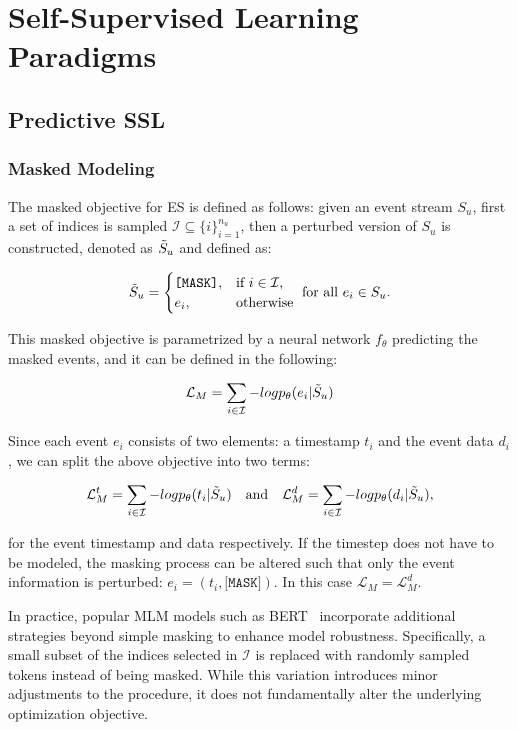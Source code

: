 \appendix
\section{Self-Supervised Learning Paradigms}
\label{appendix:ssl-paradigms}

\subsection{Predictive SSL}

\subsubsection{Masked Modeling}
\label{appendix:masked-modeling}

The masked objective for ES is defined as follows:
given an event stream $S_u$, first a set of indices is sampled $\mathcal{I} \subseteq \{i\}_{i=1}^{n_u}$, then a perturbed version of $S_u$ is constructed, denoted as $\Tilde{S}_u$ and defined as:

$$
\Tilde{S}_u =
\begin{cases} 
\texttt{[MASK]}, & \text{if } i \in \mathcal{I}, \\
e_i, & \text{otherwise}
\end{cases}
\text{ for all } e_i \in S_u.
$$

This masked objective is parametrized by a neural network $f_\theta$ predicting the masked events, and it can be defined in the following:

$$\mathcal{L}_M = \sum_{i \in \mathcal{I}} - log p_\theta (e_i | \Tilde{S}_u)$$

Since each event $e_i$ consists of two elements: a timestamp $t_i$ and the event data $d_i$, we can split the above objective into two terms:

$$\mathcal{L}^t_M = \sum_{i \in \mathcal{I}} - log p_\theta (t_i | \Tilde{S}_u) \quad \text{and} \quad \mathcal{L}^d_M = \sum_{i \in \mathcal{I}} - log p_\theta (d_i | \Tilde{S}_u),$$

for the event timestamp and data respectively.
If the timestep does not have to be modeled, the masking process can be altered such that only the event information is perturbed: $e_i = (t_i, \texttt{[MASK]})$.
In this case $\mathcal{L}_M = \mathcal{L}^d_M$.

In practice, popular MLM models such as BERT~\cite{devlin2018bert} incorporate additional strategies beyond simple masking to enhance model robustness. Specifically, a small subset of the indices selected in $\mathcal{I}$ is replaced with randomly sampled tokens instead of being masked. While this variation introduces minor adjustments to the procedure, it does not fundamentally alter the underlying optimization objective.

